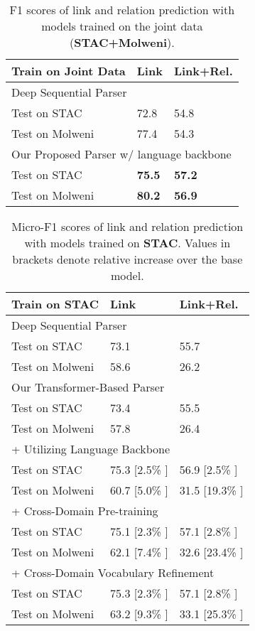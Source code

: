 \documentclass[11pt]{article}
\begin{document}
\begin{table}[t!]
\linespread{1.0}
\centering
\small
\begin{tabular}{p{3.2cm}p{1.5cm}<{\centering}p{1.5cm}<{\centering}}
\toprule
\textbf{Train on Joint Data}  & \textbf{Link} & \textbf{Link+Rel.} \\
\midrule
\multicolumn{3}{l}{Deep Sequential Parser \cite{shi2019deepSeqParser}} \\
Test on STAC & 72.8 & 54.8 \\
Test on Molweni & 77.4 & 54.3 \\
\midrule
\multicolumn{3}{l}{Our Proposed Parser w/ language backbone} \\
Test on STAC & \textbf{75.5} & \textbf{57.2} \\
Test on Molweni & \textbf{80.2} & \textbf{56.9} \\
\bottomrule
\end{tabular}
\caption{\label{result-join-table} F1 scores of link and relation prediction with models trained on the joint data (\textbf{STAC+Molweni}).}
\end{table}

\begin{table}[t!]
\linespread{1.0}
\centering
\small
\begin{tabular}{p{2.6cm}p{1.9cm}<{\centering}p{1.9cm}<{\centering}}
\toprule
\textbf{Train on STAC}   & \textbf{Link} & \textbf{Link+Rel.} \\
\midrule
\multicolumn{3}{l}{Deep Sequential Parser \cite{shi2019deepSeqParser}} \\
Test on STAC & 73.1 & 55.7 \\
Test on Molweni & 58.6 & 26.2 \\
\midrule
\midrule
\multicolumn{3}{l}{Our Transformer-Based Parser} \\
Test on STAC & 73.4 & 55.5 \\
Test on Molweni & 57.8 & 26.4 \\
\midrule
\multicolumn{3}{l}{+ Utilizing Language Backbone} \\
Test on STAC & 75.3 [2.5\% ] & 56.9 [2.5\% ] \\
Test on Molweni & 60.7 [5.0\% ] & 31.5 [19.3\% ] \\
\midrule
\multicolumn{3}{l}{+ Cross-Domain Pre-training} \\
Test on STAC & 75.1 [2.3\% ] & 57.1 [2.8\% ] \\
Test on Molweni & 62.1 [7.4\% ] & 32.6 [23.4\% ] \\
\midrule
\multicolumn{3}{l}{+ Cross-Domain Vocabulary Refinement} \\
Test on STAC & 75.3 [2.3\% ] & 57.1 [2.8\% ] \\
Test on Molweni & 63.2 [9.3\% ] & 33.1 [25.3\% ]  \\
\bottomrule
\end{tabular}
\caption{\label{result-stac-table} Micro-F1 scores of link and relation prediction with models trained on \textbf{STAC}. Values in brackets denote relative increase over the base model.}
\vspace{-0.2cm}
\end{table}
\end{document}
